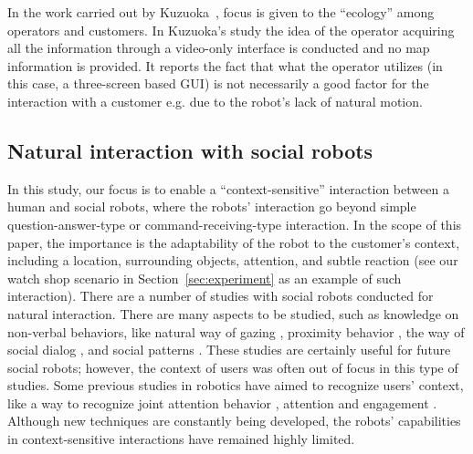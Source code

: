 \documentclass[journal]{IEEEtran}
\begin{document}
In the work carried out by Kuzuoka~\cite{kuzuoka:dual}, focus is given to the ``ecology'' among operators and customers. In Kuzuoka's	 study the idea of the operator acquiring all the information through a video-only interface is conducted and no map information is provided.
It reports the fact that what the operator utilizes (in this case, a three-screen based GUI) is not necessarily a good factor for the interaction with a customer e.g. due to the robot's lack of natural motion.


\subsection{Natural interaction with social robots}
In this study, our focus is to enable a ``context-sensitive'' interaction between a human and social robots, where the robots' interaction go beyond simple question-answer-type or command-receiving-type  interaction.
In the scope of this paper, the importance is the adaptability of the robot to the customer's context, including a location, surrounding objects, attention, and subtle reaction (see our watch shop scenario in Section~\ref{sec:experiment} as an example of such interaction).
There are a number of studies with social robots conducted for natural interaction.
There are many aspects to be studied, such as knowledge on non-verbal behaviors, like natural way of gazing \cite{carff:human, drury:lassoing}, proximity behavior \cite{drury:decomposition, drury:awareness}, the way of social dialog \cite{green:applying}, and social patterns \cite{woods:comparing}.
These studies are certainly useful for future social robots; however, the context of users was often out of focus in this type of studies.
Some previous studies in robotics have aimed to recognize users' context, like a way to recognize joint attention behavior \cite{glas:simultaneous}, attention \cite{glas:field} and engagement \cite{glas:laser}.
Although new techniques are constantly being developed, the robots' capabilities in context-sensitive interactions have remained highly limited.
\end{document}
